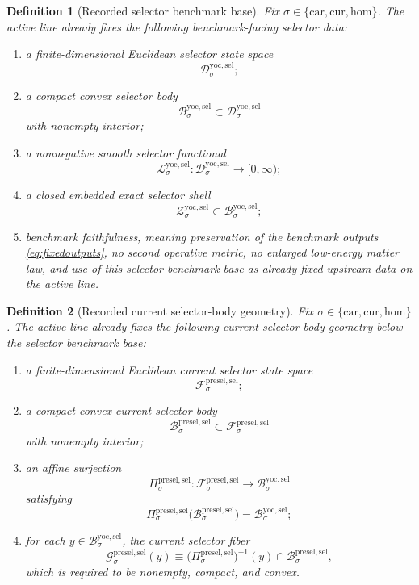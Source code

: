 \documentclass[11pt]{article}
\newcommand{\Car}{\mathrm{car}}
\newcommand{\Cur}{\mathrm{cur}}
\newcommand{\Hom}{\mathrm{hom}}
\newcommand{\YoctoSelectorSpace}[1]{\mathcal D_{#1}^{\mathrm{yoc,sel}}}
\newcommand{\YoctoSelectorBody}[1]{\mathcal B_{#1}^{\mathrm{yoc,sel}}}
\newcommand{\YoctoSelectorFunctional}[1]{\mathscr L_{#1}^{\mathrm{yoc,sel}}}
\newcommand{\YoctoSelectorShell}[1]{\mathcal Z_{#1}^{\mathrm{yoc,sel}}}
\newcommand{\PreSectionSelectorSpace}[1]{\mathcal F_{#1}^{\mathrm{presel,sel}}}
\newcommand{\PreSectionSelectorBody}[1]{\mathcal B_{#1}^{\mathrm{presel,sel}}}
\newcommand{\PreSectionSelectorProj}[1]{\Pi_{#1}^{\mathrm{presel,sel}}}
\newcommand{\PreSectionSelectorFiber}[2]{\mathcal G_{#1}^{\mathrm{presel,sel}}(#2)}
\newtheorem{definition}{Definition}
\begin{document}
\begin{definition}[Recorded selector benchmark base]
\label{def:selectorbase}
Fix \(\sigma\in\{\Car,\Cur,\Hom\}\). The active line already fixes the following benchmark-facing selector data:
\begin{enumerate}
    \item a finite-dimensional Euclidean selector state space
    \[
    \YoctoSelectorSpace{\sigma};
    \]
    \item a compact convex selector body
    \[
    \YoctoSelectorBody{\sigma}\subset\YoctoSelectorSpace{\sigma}
    \]
    with nonempty interior;
    \item a nonnegative smooth selector functional
    \[
    \YoctoSelectorFunctional{\sigma}:\YoctoSelectorSpace{\sigma}\to[0,\infty);
    \]
    \item a closed embedded exact selector shell
    \[
    \YoctoSelectorShell{\sigma}\subset\YoctoSelectorBody{\sigma};
    \]
    \item benchmark faithfulness, meaning preservation of the benchmark outputs \eqref{eq:fixedoutputs}, no second operative metric, no enlarged low-energy matter law, and use of this selector benchmark base as already fixed upstream data on the active line.
\end{enumerate}
\end{definition}

\begin{definition}[Recorded current selector-body geometry]
\label{def:geometry}
Fix \(\sigma\in\{\Car,\Cur,\Hom\}\). The active line already fixes the following current selector-body geometry below the selector benchmark base:
\begin{enumerate}
    \item a finite-dimensional Euclidean current selector state space
    \[
    \PreSectionSelectorSpace{\sigma};
    \]
    \item a compact convex current selector body
    \[
    \PreSectionSelectorBody{\sigma}\subset\PreSectionSelectorSpace{\sigma}
    \]
    with nonempty interior;
    \item an affine surjection
    \[
    \PreSectionSelectorProj{\sigma}:\PreSectionSelectorSpace{\sigma}\to\YoctoSelectorBody{\sigma}
    \]
    satisfying
    \[
    \PreSectionSelectorProj{\sigma}\bigl(\PreSectionSelectorBody{\sigma}\bigr)
    =
    \YoctoSelectorBody{\sigma};
    \]
    \item for each \(y\in\YoctoSelectorBody{\sigma}\), the current selector fiber
    \[
    \PreSectionSelectorFiber{\sigma}{y}
    \equiv
    \bigl(\PreSectionSelectorProj{\sigma}\bigr)^{-1}(y)\cap\PreSectionSelectorBody{\sigma},
    \]
    which is required to be nonempty, compact, and convex.
\end{enumerate}
\end{definition}
\end{document}
